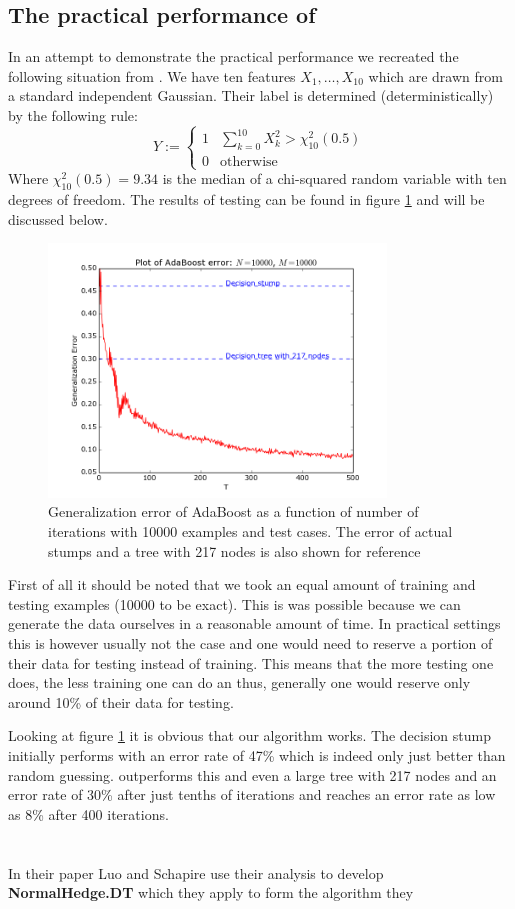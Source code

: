 \subsection{The practical performance of \adaB}
\label{subsec:pracPerf}
In an attempt to demonstrate the practical performance we recreated the following situation from \cite{Hastie2009}. We have ten features $X_1,\ldots,X_{10}$ which are drawn from a standard independent Gaussian. Their label is determined (deterministically) by the following rule: $$Y:=\begin{cases}
1 & \sum_{k=0}^{10} X^2_k > \chi_{10}^2(0.5)\\
0 & \text{otherwise}
\end{cases}$$ Where $\chi_{10}^2(0.5)=9.34$ is the median of a chi-squared random variable with ten degrees of freedom. The results of testing can be found in figure \ref{fig:adaB} and will be discussed below. 

\begin{figure}[!ht]
  \centering
      \includegraphics[width=0.8\textwidth]{generated/longCorrect.png}
  \caption{Generalization error of AdaBoost as a function of number of iterations with 10000 examples and test cases. The error of actual stumps and a tree with 217 nodes is also shown for reference}
      \label{fig:adaB}
\end{figure}

First of all it should be noted that we took an equal amount of training and testing examples (10000 to be exact). This is was possible because we can generate the data ourselves in a reasonable amount of time. In practical settings this is however usually not the case and one would need to reserve a portion of their data for testing instead of training. This means that the more testing one does, the less training one can do an thus, generally one would reserve only around 10\% of their data for testing.
\par Looking at figure \ref{fig:adaB} it is obvious that our algorithm works. The decision stump initially performs with an error rate of 47\% which is indeed only just better than random guessing. \adaB outperforms this and even a large tree with 217 nodes and an error rate of 30\% after just tenths of iterations and reaches an error rate as low as 8\% after 400 iterations. 

\section{\adaN}
\label{sec:adaN}
In their paper \cite{Luo2014} Luo and Schapire use their analysis to develop \textbf{NormalHedge.DT} which they apply to form the algorithm they